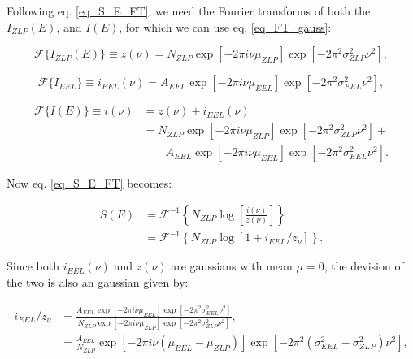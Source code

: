 Following eq. \eqref{eq_S_E_FT}, we need the Fourier transforms of both the $I_{ZLP}(E)$, and $I(E)$, for which we can use eq. \eqref{eq_FT_gauss}:

\begin{equation}\label{eq_i_nu_gauss}
    \mathcal{F}\{I_{ZLP}(E)\} \equiv z(\nu) = N_{ZLP}\exp{\left[-2 \pi i \nu \mu_{ZLP}\right]} \exp{\left[-2 \pi^{2} \sigma_{ZLP}^{2} \nu^{2}\right]},
\end{equation}

\begin{equation}\label{eq_i_EEL_gauss}
    \mathcal{F}\{I_{EEL}\} \equiv i_{EEL}(\nu) = A_{EEL} \exp{\left[-2 \pi i \nu \mu_{EEL}\right]} \exp{\left[-2 \pi^{2} \sigma_{EEL}^{2} \nu^{2}\right]},
\end{equation}

\begin{equation}
\begin{aligned}
\mathcal{F}\{I(E)\} \equiv i(\nu) &= z(\nu) + i_{EEL}(\nu) \\
&= N_{ZLP}  \exp{\left[-2 \pi i \nu \mu_{ZLP}\right]} \exp{\left[-2 \pi^{2} \sigma_{ZLP}^{2} \nu^{2}\right]} + \\
& \quad \quad A_{EEL}  \exp{\left[-2 \pi i \nu \mu_{EEL}\right]} \exp{\left[-2 \pi^{2} \sigma_{EEL}^{2} \nu^{2}\right]}.
\end{aligned}
\end{equation}



Now eq. \eqref{eq_S_E_FT} becomes:

\begin{equation}\label{eq_S_gauss}
\begin{aligned}
S(E) &= \mathcal{F}^{-1}\left\{N_{ZLP}\operatorname{log}\left[\frac{i(\nu)}{z(\nu)}\right]\right\} \\
&= \mathcal{F}^{-1}\left\{N_{ZLP}\operatorname{log}\left[1+ i_{EEL}/z_{\nu}\right]\right\}.
\end{aligned}
\end{equation}

Since both $i_{EEL}(\nu)$ and $z(\nu)$ are gaussians with mean $\mu = 0$, the devision of the two is also an gaussian given by:

\begin{equation}
\begin{aligned}
i_{EEL}/z_{\nu} &= \frac{A_{EEL} \exp{\left[-2 \pi i \nu \mu_{EEL}\right]} \exp{\left[-2 \pi^{2} \sigma_{EEL}^{2} \nu^{2}\right]}}{N_{ZLP} \exp{\left[-2 \pi i \nu \mu_{ZLP}\right]} \exp{\left[-2 \pi^{2} \sigma_{ZLP}^{2} \nu^{2}\right]}} ,\\
&= \frac{A_{EEL}}{N_{ZLP}} \exp{\left[-2 \pi i \nu (\mu_{EEL} - \mu_{ZLP})\right]} \exp{\left[-2 \pi^{2} (\sigma_{EEL}^{2} - \sigma_{ZLP}^{2}) \nu^{2}\right]},
\end{aligned}
\end{equation}

